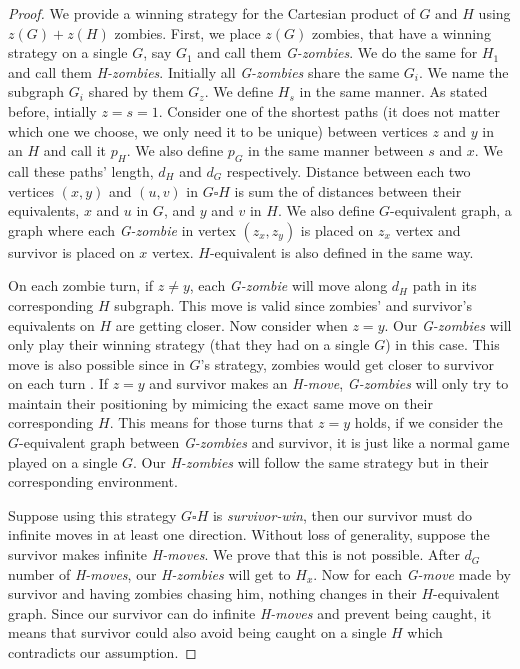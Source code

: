 \documentclass[1p]{elsarticle}
\begin{document}
\begin{proof}
	We provide a winning strategy for the Cartesian product of $G$ and $H$ using $z(G)+z(H)$ zombies. First, we place
	$z(G)$ zombies, that have a winning strategy on a single $G$, say $G_{1}$ and call them {\it G-zombies}. We do the
	same for $H_{1}$ and call them {\it H-zombies}. Initially all {\it G-zombies} share the same $G_{i}$. We name the
	subgraph $G_{i}$ shared by them $G_{z}$. We define $H_{s}$ in the same manner. As stated before, intially $z=s=1$.
	Consider one of the shortest paths (it does not matter which one we choose, we only need it to be unique) between
	vertices $z$ and $y$ in an $H$ and call it $p_H$. We also define $p_G$  in the same manner between $s$ and $x$. We
	call these paths' length, $d_H$ and $d_G$ respectively. Distance between each two vertices $(x,y)$ and $(u,v)$ in $G
	\square H$ is sum the of distances between their equivalents, $x$ and $u$ in $G$, and $y$ and $v$ in $H$. We also define
	$G$-equivalent graph, a graph where each {\it G-zombie} in vertex $(z_x,z_y)$ is placed on $z_x$ vertex and survivor
	is placed on $x$ vertex. $H$-equivalent is also defined in the same way.

	On each zombie turn, if $z \neq y$, each {\it G-zombie} will move along $d_H$ path in its corresponding $H$
	subgraph.  This move is valid since zombies' and survivor's equivalents on $H$ are getting closer. Now consider when $z =
	y$. Our {\it G-zombies} will only play their winning strategy (that they had on a single $G$) in this case. This
	move is also possible since in $G$'s strategy, zombies would get closer to survivor on each turn . If $z = y$ and
	survivor makes an {\it H-move}, {\it G-zombies} will only try to maintain their positioning by mimicing the exact
	same move on their corresponding $H$. This means for those turns that $z=y$ holds, if we consider the $G$-equivalent
	graph between {\it G-zombies} and survivor, it is just like a normal game played on a single $G$. Our {\it
	H-zombies} will follow the same strategy but in their corresponding environment.
	
	
	Suppose using this strategy $G \square H$ is {\it survivor-win}, then our survivor must do infinite moves in at
	least one direction. Without loss of generality, suppose the survivor makes infinite {\it H-moves}. We prove that
	this is not possible. After $d_G$ number of {\it H-moves}, our {\it H-zombies} will get to $H_x$. Now for each {\it
	G-move} made by survivor and having zombies chasing him, nothing changes in their $H$-equivalent graph. Since our
	survivor can do infinite {\it H-moves} and prevent being caught, it means that survivor could also avoid being
	caught on a single $H$ which contradicts our assumption.
	
\end{proof}
\end{document}
